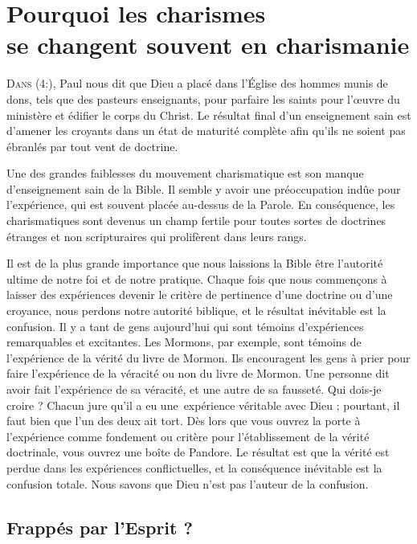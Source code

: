 \chapter[Pourquoi les charismes se changent souvent en charismanie]{Pourquoi les charismes\\ se changent souvent en charismanie}
\renewcommand{\chaphead}{\textls[-10]{Pourquoi les charismes se changent souvent\dots}}

\lettrine{D}{ans} (4:),
 Paul nous dit que Dieu a placé dans l'Église
 des hommes munis de dons, tels que des pasteurs enseignants,
 pour parfaire les saints pour l'œuvre du ministère et édifier le corps
 du Christ. Le résultat final d'un enseignement sain est d'amener
 les croyants dans un état de maturité complète afin qu'ils ne soient
 pas ébranlés par tout vent de doctrine.

Une des grandes faiblesses du mouvement charismatique est son manque
 d'enseignement sain de la Bible. Il semble y avoir une préoccupation
 indûe pour l'expérience, qui est souvent placée au-dessus de la Parole.
 En conséquence, les charismatiques sont devenus un champ fertile
 pour toutes sortes de doctrines étranges et non scripturaires qui prolifèrent
 dans leurs rangs.

Il est de la plus grande importance que nous laissions la Bible être
 l'autorité ultime de notre foi et de notre pratique.
 Chaque fois que nous commençons à laisser des expériences
 devenir le critère de pertinence d'une doctrine ou d'une croyance,
 nous perdons notre autorité biblique, et le résultat inévitable
 est la confusion. Il y a tant de gens aujourd'hui qui sont témoins
 d'expériences remarquables et excitantes. Les Mormons, par exemple,
 \Og sont témoins \Fg{} de l'expé\-rience de la vérité du livre de Mormon.
 Ils encouragent les gens à prier pour faire l'expérience de la véracité
 ou non du livre de Mormon. Une personne dit avoir fait l'expérience
 de sa véracité, et une autre de sa fausseté. Qui dois-je croire ?
 Chacun jure qu'il a eu une~expérience véritable avec Dieu ;
 pourtant, il faut bien que l'un des deux ait tort.
 Dès lors que vous ouvrez la porte à l'expérience comme fondement
 ou critère pour l'établissement de la vérité doctrinale, vous ouvrez une boîte de Pandore.
 Le résultat est que la vérité est perdue dans les expériences
 conflictuelles, et la conséquence inévitable est la confusion totale.
 Nous savons que Dieu n'est pas l'auteur de la confusion.


\section{Frapp\'es par l'Esprit ?}

